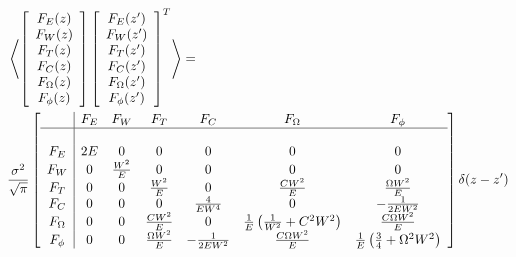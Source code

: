 \begin{align}&\left< \left[\begin{array}{c}
F_{E}(z) \\ 
F_{W}(z) \\
F_{T}(z) \\
F_{C}(z) \\ 
F_{\Omega}(z)\\ 
F_{\phi}(z) \\
\end{array}\right] \left[\begin{array}{c}
F_{E}(z') \\ 
F_{W}(z') \\
F_{T}(z') \\
F_{C}(z') \\
F_{\Omega}(z')\\ 
F_{\phi}(z') \\
\end{array}\right]^{T} \right>=\\
& \frac{\sigma^2}{\sqrt{\pi}} \left[\begin{array}{c|cccccc}
           & F_{E} & F_{W}           & F_{T}                &  F_{C}              & F_{\Omega}                                         & F_{\phi}                                               \\
\hline                                                                                                                                                                                          \\
F_{E}      & 2E    & 0               & 0                    &  0                  & 0                                                  & 0                                                      \\
F_{W}      & 0     & \frac{W^2}{ E } & 0                    &  0                  & 0                                                  & 0                                                      \\
F_{T}      & 0     & 0               & \frac{W^2}{E}        &  0                  & \frac{ CW^2 }{ E}                                  & \frac{\Omega W^2 }{ E}                                 \\ 
F_{C}      & 0     & 0               & 0                    &  \frac{4}{ E W^4 }  & 0                                                  & -\frac{1}{2 E W^2}                                      \\
F_{\Omega} & 0     & 0               & \frac{CW^2}{E}       &  0                  & \frac{1}{E} \left( \frac{1}{W^2} + C^2W^2 \right)  & \frac{C\Omega  W^2 }{ E }                              \\
F_{\phi}   & 0     & 0               & \frac{\Omega W^2}{E} &  -\frac{1}{2 E W^2}    & \frac{C\Omega W^2 }{E }                            & \frac{1}{E} \left(\frac{3}{4}   + \Omega^2 W^2 \right) \\ 
\end{array}\right] \delta(z-z')
 \end{align}
